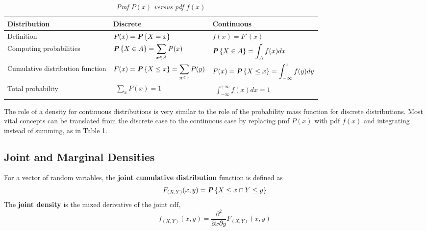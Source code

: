 \begin{table}[ht]
  \renewcommand{\arraystretch}{2}
  \centering
  \begin{tabular}{|l|l|l|} 
  \hline
  \textbf{Distribution}            & \textbf{Discrete}                               & \textbf{Continuous}                                 \\ 
  \hline
  Definition                       & $P(x) = \textbf{\textit{P}}\left\{X = x\right\}$                           & $f(x) = F'(x)$                                      \\ 
  \hline
  Computing probabilities          & $\begin{aligned}\textbf{\textit{P}}\left\{X \in A\right\} = \sum_{x \in A} P(x)\end{aligned}$          & $\begin{aligned}\textbf{\textit{P}}\left\{X \in A\right\} = \int_A f(x)dx\end{aligned}$                    \\ 
  \hline
  Cumulative
  distribution
  function & $\begin{aligned}F(x) = \textbf{\textit{P}}\left\{X \leq x\right\} = \sum_{y \leq x} P(y)\end{aligned}$ & $\begin{aligned}F(x) = \textbf{\textit{P}}\left\{X \leq x\right\} = \int_{-\infty}^x f(y)dy\end{aligned}$  \\ 
  \hline
  Total probability                & $\begin{aligned}\sum_{x} P(x) = 1\end{aligned}$                             & $\begin{aligned}\int_{-\infty}^{+\infty} f(x)dx = 1\end{aligned}$                \\
  \hline
  \end{tabular}
  \caption{\textit{Pmf $P(x)$ versus pdf $f(x)$}}
\end{table}

The role of a density for continuous distributions is very similar to the role of the probability mass function for discrete distributions. Most vital concepts can be translated from the discrete case to the continuous case by replacing pmf $P(x)$ with pdf $f(x)$ and integrating instead of summing, as in Table 1.

\subsection{Joint and Marginal Densities}

\begin{definition}{}
  For a vector of random variables, the \textbf{joint cumulative distribution} function is defined as
  \begin{equation*}
    F_{(X, Y)} (x, y) = \textbf{\textit{P}}\left\{X \leq x \cap Y \leq y\right\}
  \end{equation*}
  The \textbf{joint density} is the mixed derivative of the joint cdf,
  \begin{equation*}
    f_{(X, Y)} (x, y) = \frac{\partial^2}{\partial x \partial y} F_{(X, Y)} (x, y)
  \end{equation*}
\end{definition}

